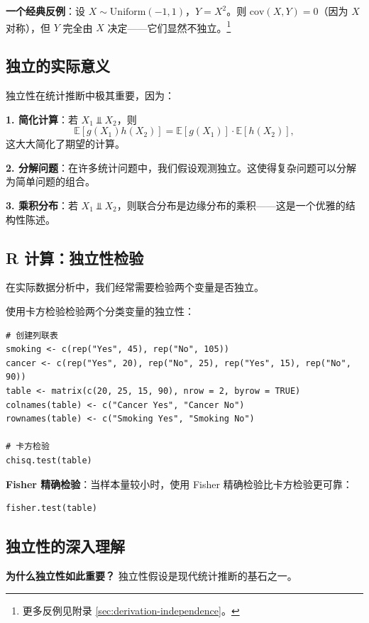\textbf{一个经典反例}：设 $X \sim \text{Uniform}(-1, 1)$，$Y = X^2$。则 $\text{cov}(X, Y) = 0$（因为 $X$ 对称），但 $Y$ 完全由 $X$ 决定——它们显然不独立。\footnote{更多反例见附录 \cref{sec:derivation-independence}。}

\subsection{独立的实际意义}

独立性在统计推断中极其重要，因为：

\textbf{1. 简化计算}：若 $X_1 \Perp X_2$，则
\[
\mathbb{E}[g(X_1)h(X_2)] = \mathbb{E}[g(X_1)] \cdot \mathbb{E}[h(X_2)],
\]
这大大简化了期望的计算。

\textbf{2. 分解问题}：在许多统计问题中，我们假设观测独立。这使得复杂问题可以分解为简单问题的组合。

\textbf{3. 乘积分布}：若 $X_1 \Perp X_2$，则联合分布是边缘分布的乘积——这是一个优雅的结构性陈述。

\subsection{R 计算：独立性检验}

在实际数据分析中，我们经常需要检验两个变量是否独立。

\begin{example}[独立性检验]\label{ex:independence-test-ch2}
使用卡方检验检验两个分类变量的独立性：
\begin{verbatim}
# 创建列联表
smoking <- c(rep("Yes", 45), rep("No", 105))
cancer <- c(rep("Yes", 20), rep("No", 25), rep("Yes", 15), rep("No", 90))
table <- matrix(c(20, 25, 15, 90), nrow = 2, byrow = TRUE)
colnames(table) <- c("Cancer Yes", "Cancer No")
rownames(table) <- c("Smoking Yes", "Smoking No")

# 卡方检验
chisq.test(table)
\end{verbatim}
\end{example}

\textbf{Fisher 精确检验}：当样本量较小时，使用 Fisher 精确检验比卡方检验更可靠：
\begin{verbatim}
fisher.test(table)
\end{verbatim}


\subsection{独立性的深入理解}

\textbf{为什么独立性如此重要？} 独立性假设是现代统计推断的基石之一。

